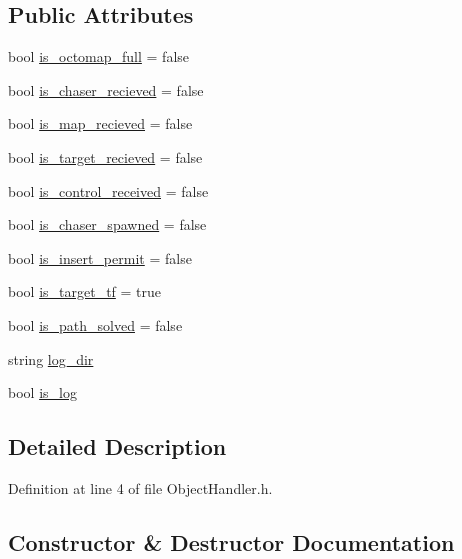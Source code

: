 \subsection*{Public Attributes}
\begin{DoxyCompactItemize}
\item 
bool \hyperlink{class_objects_handler_a56f70ac04c01e8b948a4b44fa5670f49}{is\+\_\+octomap\+\_\+full} = false
\item 
bool \hyperlink{class_objects_handler_a86f8528ff5697c87fc6a3fcd6ba0f42c}{is\+\_\+chaser\+\_\+recieved} = false
\item 
bool \hyperlink{class_objects_handler_acf1ef1b318defc2a39d87cea72689478}{is\+\_\+map\+\_\+recieved} = false
\item 
bool \hyperlink{class_objects_handler_a7691f3e1ec58e55ead30c50c555f169a}{is\+\_\+target\+\_\+recieved} = false
\item 
bool \hyperlink{class_objects_handler_a88fb913340c535df81f3b7ae5f06df61}{is\+\_\+control\+\_\+received} = false
\item 
bool \hyperlink{class_objects_handler_a16165ae7c0167ba8d2a0151a8a4fbfd5}{is\+\_\+chaser\+\_\+spawned} = false
\item 
bool \hyperlink{class_objects_handler_acaefe98eb412d4c32cda2bf0bd602ae7}{is\+\_\+insert\+\_\+permit} = false
\item 
bool \hyperlink{class_objects_handler_a98d5880c9ab3a4b227d8c57403213f65}{is\+\_\+target\+\_\+tf} = true
\item 
bool \hyperlink{class_objects_handler_ad8d1ea6646024f0a03e154a7c2c07682}{is\+\_\+path\+\_\+solved} = false
\item 
string \hyperlink{class_objects_handler_a057b7b0a2fa3eca3a83b0d8de54e0f60}{log\+\_\+dir}
\item 
bool \hyperlink{class_objects_handler_a953cbc6386a438635bd1b12a8e479b38}{is\+\_\+log}
\end{DoxyCompactItemize}


\subsection{Detailed Description}


Definition at line 4 of file Object\+Handler.\+h.



\subsection{Constructor \& Destructor Documentation}
